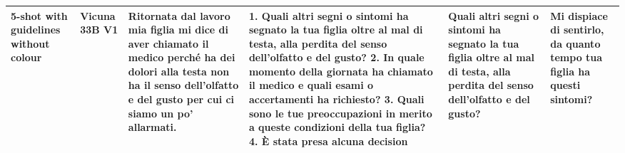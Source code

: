 \begin{table}[!htbp]
\begin{tabularx}{\linewidth}{p{2.5cm}| p{1.5cm} | p{2cm} | X | p{2cm} | p{2cm} }
\textbf{5-shot with guidelines without colour} &  Vicuna 33B V1  & Ritornata dal lavoro mia figlia mi dice di aver chiamato il medico perché ha dei dolori alla testa non ha il senso dell'olfatto e del gusto per cui ci siamo un po' allarmati. & 1. Quali altri segni o sintomi ha segnato la tua figlia oltre al mal di testa, alla perdita del senso dell'olfatto e del gusto? 2. In quale momento della giornata ha chiamato il medico e quali esami o accertamenti ha richiesto? 3. Quali sono le tue preoccupazioni in merito a queste condizioni della tua figlia? 4. È stata presa alcuna decision & Quali altri segni o sintomi ha segnato la tua figlia oltre al mal di testa, alla perdita del senso dell'olfatto e del gusto? &Mi dispiace di sentirlo, da quanto tempo tua figlia ha questi sintomi? \\
        \bottomrule
    \end{tabularx}
\end{table}
